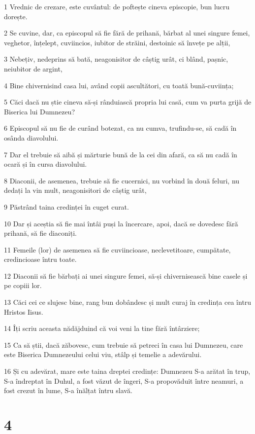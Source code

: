 \par 1 Vrednic de crezare, este cuvântul: de poftește cineva episcopie, bun lucru dorește.
\par 2 Se cuvine, dar, ca episcopul să fie fără de prihană, bărbat al unei singure femei, veghetor, înțelept, cuviincios, iubitor de străini, destoinic să învețe pe alții,
\par 3 Nebețiv, nedeprins să bată, neagonisitor de câștig urât, ci blând, pașnic, neiubitor de argint,
\par 4 Bine chivernisind casa lui, având copii ascultători, cu toată bună-cuviința;
\par 5 Căci dacă nu știe cineva să-și rânduiască propria lui casă, cum va purta grijă de Biserica lui Dumnezeu?
\par 6 Episcopul să nu fie de curând botezat, ca nu cumva, trufindu-se, să cadă în osânda diavolului.
\par 7 Dar el trebuie să aibă și mărturie bună de la cei din afară, ca să nu cadă în ocară și în cursa diavolului.
\par 8 Diaconii, de asemenea, trebuie să fie cucernici, nu vorbind în două feluri, nu dedați la vin mult, neagonisitori de câștig urât,
\par 9 Păstrând taina credinței în cuget curat.
\par 10 Dar și aceștia să fie mai întâi puși la încercare, apoi, dacă se dovedesc fără prihană, să fie diaconiți.
\par 11 Femeile (lor) de asemenea să fie cuviincioase, neclevetitoare, cumpătate, credincioase întru toate.
\par 12 Diaconii să fie bărbați ai unei singure femei, să-și chivernisească bine casele și pe copiii lor.
\par 13 Căci cei ce slujesc bine, rang bun dobândesc și mult curaj în credința cea întru Hristos Iisus.
\par 14 Îți scriu aceasta nădăjduind că voi veni la tine fără întârziere;
\par 15 Ca să știi, dacă zăbovesc, cum trebuie să petreci în casa lui Dumnezeu, care este Biserica Dumnezeului celui viu, stâlp și temelie a adevărului.
\par 16 Și cu adevărat, mare este taina dreptei credințe: Dumnezeu S-a arătat în trup, S-a îndreptat în Duhul, a fost văzut de îngeri, S-a propovăduit între neamuri, a fost crezut în lume, S-a înălțat întru slavă.

\chapter{4}

